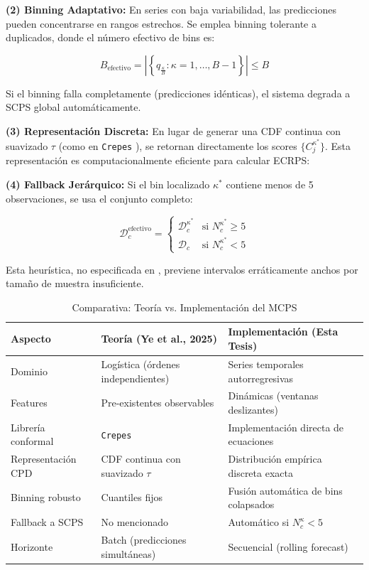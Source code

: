 \textbf{(2) Binning Adaptativo:} En series con baja variabilidad, las predicciones pueden concentrarse en rangos estrechos. Se emplea binning tolerante a duplicados, donde el número efectivo de bins es:

\begin{equation}
B_{\text{efectivo}} = \left|\left\{q_{\frac{\kappa}{B}} : \kappa = 1, \ldots, B-1\right\}\right| \leq B
\end{equation}

Si el binning falla completamente (predicciones idénticas), el sistema degrada a SCPS global automáticamente.

\textbf{(3) Representación Discreta:} En lugar de generar una CDF continua con suavizado $\tau$ (como en \texttt{Crepes} \parencite{Bostrom2022}), se retornan directamente los scores $\{C_j^{\kappa^*}\}$. Esta representación es computacionalmente eficiente para calcular ECRPS:


\textbf{(4) Fallback Jerárquico:} Si el bin localizado $\kappa^*$ contiene menos de 5 observaciones, se usa el conjunto completo:

\begin{equation}
\mathcal{D}_c^{\text{efectivo}} = 
\begin{cases}
\mathcal{D}_c^{\kappa^*} & \text{si } N_c^{\kappa^*} \geq 5 \\
\mathcal{D}_c & \text{si } N_c^{\kappa^*} < 5
\end{cases}
\end{equation}

Esta heurística, no especificada en \textcite{Bostrom2021}, previene intervalos erráticamente anchos por tamaño de muestra insuficiente.

\begin{table}[htbp]
\centering
\caption{Comparativa: Teoría vs. Implementación del MCPS}
\label{tab:mcps_comparison}
\small
\begin{tabular}{>{\raggedright\arraybackslash}p{3cm}%
                >{\raggedright\arraybackslash}p{5cm}%
                >{\raggedright\arraybackslash}p{5.5cm}}
\toprule
\textbf{Aspecto} & \textbf{Teoría (Ye et al., 2025)} & \textbf{Implementación (Esta Tesis)} \\
\midrule
Dominio & Logística (órdenes independientes) & Series temporales autorregresivas \\
Features & Pre-existentes observables & Dinámicas (ventanas deslizantes) \\
Librería conformal & \texttt{Crepes} \parencite{Bostrom2022} & Implementación directa de ecuaciones \\
Representación CPD & CDF continua con suavizado $\tau$ & Distribución empírica discreta exacta \\
Binning robusto & Cuantiles fijos & Fusión automática de bins colapsados \\
Fallback a SCPS & No mencionado & Automático si $N_c^{\kappa} < 5$ \\
Horizonte & Batch (predicciones simultáneas) & Secuencial (rolling forecast) \\
\bottomrule
\end{tabular}
\end{table}


